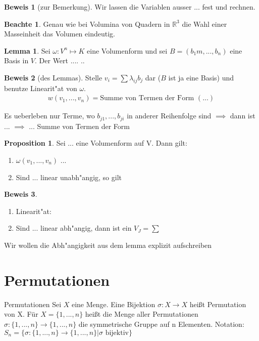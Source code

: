 \documentclass[oneside,fontsize=11pt,paper=a4,BCOR=0mm,DIV=12,automark,headsepline]{scrbook}
\theoremstyle{remark}
\theoremstyle{definition}
\newtheorem*{notte}{Beachte}
\newtheorem*{proposition}{Proposition}
\newtheorem{lemma}{Lemma}[section]
\theoremstyle{definition}
\newtheorem*{prof}{Beweis}
\theoremstyle{remark}
\begin{document}
\begin{prof}[zur Bemerkung]
  Wir lassen die Variablen ausser ... fest und rechnen.
\end{prof}

\begin{notte}
  Genau wie bei Volumina von Quadern in $\mathbb{R}^3$ die Wahl einer
  Masseinheit das Volumen eindeutig.
\end{notte}

\begin{lemma}
  Sei $\omega: V^n\mapsto K$ eine Volumenform und sei $B=(b_1m, ... , b_n)$
  eine Basis in $V$. Der Wert ....  ..
\end{lemma}

\begin{prof}[des Lemmas]
  Stelle $v_i=\sum{\lambda_{ij}b_j}$ dar ($B$ ist ja eine Basis) und benutze
  Linearit"at von $\omega$.
  \begin{align*}
    w(v_1, ..., v_n)=\text{Summe von Termen der Form } (...)
  \end{align*}

  Es ueberleben nur Terme, wo $b_{j1},...,b_{ji}$ in anderer Reihenfolge sind
  $\implies$ dann ist ... $\implies$ ... Summe von Termen der Form
\end{prof}
\begin{proposition}
  Sei ... eine Volumenform auf V. Dann gilt:
  \begin{enumerate}
  \item $\omega(v_1,...,v_n)$ ...
  \item Sind ... linear unabh"angig, so gilt
  \end{enumerate}
\end{proposition}

\begin{prof}
  \begin{enumerate}
  \item Linearit"at: 
  \item Sind ... linear abh"angig, dann ist ein $V_J=\sum$
  \end{enumerate}
\end{prof}

Wir wollen die Abh"angigkeit aus dem lemma explizit aufschreiben

\section{Permutationen}
\label{sec:perm}

\begin{definition}{Permutationen}{}
  Sei $X$ eine Menge. Eine Bijektion $\sigma: X \to X$ heißt Permutation
  von X. \newline
  Für \(X = \{1,...,n\}\) heißt die Menge aller Permutationen \(\sigma: \{1,...,n\}\to\{1,...,n\}\) die symmetrische Gruppe auf n Elementen. Notation: \(S_n = \{ \sigma: \{1,...,n\}\to\{1,...,n\}|\sigma\text{ bijektiv}\}\)
\end{definition}
\end{document}
